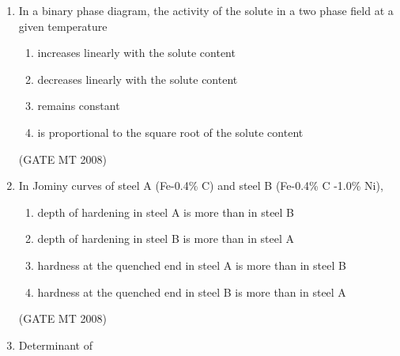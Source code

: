 \documentclass[journal, 11pt, onecolumn]{IEEEtran}
\theoremstyle{remark}
\begin{document}
\begin{enumerate}
\hfill(GATE MT 2008)


\begin{multicols}{4}
\begin{enumerate}
\item P, Q
\item P, R 
\item R, S
\item Q, R
\end{enumerate}
\end{multicols}

\hfill(GATE MT 2008)

\item In a binary phase diagram, the activity of the solute in a two phase field at a given temperature

\begin{multicols}{1}
\begin{enumerate}
\item increases linearly with the solute content
\item decreases linearly with the solute content
\item remains constant
\item is proportional to the square root of the solute content
\end{enumerate}
\end{multicols}

\hfill(GATE MT 2008)

\item In Jominy curves of steel A (Fe-0.4\% C) and steel B (Fe-0.4\% C -1.0\% Ni),

\begin{multicols}{1}
\begin{enumerate}
\item depth of hardening in steel A is more than in steel B 
\item depth of hardening in steel B is more than in steel A
\item hardness at the quenched end in steel A is more than in steel B
\item hardness at the quenched end in steel B is more than in steel A
\end{enumerate}
\end{multicols}

\hfill(GATE MT 2008)

\item Determinant of 


\end{enumerate}
\end{document}
